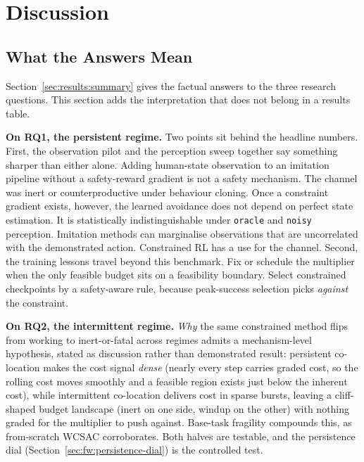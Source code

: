 \documentclass[11pt,a4paper]{report}
\begin{document}
\chapter{Discussion}
\label{ch:disc}

\section{What the Answers Mean}
\label{sec:disc:rqs-revisited}

Section~\ref{sec:results:summary} gives the factual answers to the
three research questions. This section adds the interpretation that
does not belong in a results table.

\textbf{On RQ1, the persistent regime.} Two points sit behind the
headline numbers. First, the observation pilot and the perception
sweep together say something sharper than either alone. Adding
human-state observation to an imitation pipeline without a
safety-reward gradient is not a safety mechanism. The channel was
inert or counterproductive under behaviour cloning. Once a constraint
gradient exists, however, the learned avoidance does not depend on
perfect state estimation. It is statistically indistinguishable under
\texttt{oracle} and \texttt{noisy} perception. Imitation methods can
marginalise observations that are uncorrelated with the demonstrated
action. Constrained RL has a use for the channel. Second, the training
lessons travel beyond this benchmark. Fix or schedule the multiplier
when the only feasible budget sits on a feasibility boundary. Select
constrained checkpoints by a safety-aware rule, because peak-success
selection picks \emph{against} the constraint.

\textbf{On RQ2, the intermittent regime.} \emph{Why} the same
constrained method flips from working to inert-or-fatal across
regimes admits a mechanism-level hypothesis, stated as discussion
rather than demonstrated result: persistent co-location makes the
cost signal \emph{dense} (nearly every step carries graded cost, so
the rolling cost moves smoothly and a feasible region exists just
below the inherent cost), while intermittent co-location delivers
cost in sparse bursts, leaving a cliff-shaped budget landscape
(inert on one side, windup on the other) with nothing graded for
the multiplier to push against. Base-task fragility compounds this,
as from-scratch WCSAC corroborates. Both halves are testable, and
the persistence dial (Section~\ref{sec:fw:persistence-dial}) is the
controlled test.
\end{document}
